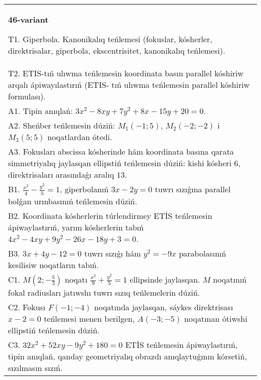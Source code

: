 \documentclass{article}
\begin{document}
\begin{tabular}{m{17cm}}
\textbf{46-variant}
\newline

T1. Giperbola. Kanonikalıq teńlemesi (fokuslar, kósherler, direktrisalar, giperbola, ekscentrisitet, kanonikalıq teńlemesi).\\

T2. ETIS-tıń ulıwma teńlemesin koordinata basın parallel kóshiriw arqalı ápiwayılastırıń (ETIS- tıń ulıwma teńlemesin parallel kóshiriw formulası).\\

A1. Tipin anıqlań: $3 x^{2}-8 xy+7 y^{2}+8 x-15 y+20=0$.\\

A2. Sheńber teńlemesin dúziń: $M_1 (-1;5) $, $M_2 (-2;-2) $ i $M_3 (5;5) $ noqatlardan ótedi.\\

A3. Fokusları abscissa kósherinde hám koordinata basına qarata simmetriyalıq jaylasqan ellipstiń teńlemesin dúziń: kishi kósheri $6$, direktrisaları arasındaǵı aralıq $13$.\\

B1. $\frac{x^{2}}{4} - \frac{y^{2}}{5} = 1$, giperbolanıń $3x - 2y = 0$ tuwrı sızıǵına parallel bolǵan urınbasınıń teńlemesin dúziń.  \\

B2. Koordinata kósherlerin túrlendirmey ETİS teńlemesin ápiwaylastırıń, yarım kósherlerin tabıń $4x^{2} - 4xy + 9y^{2} - 26x - 18y + 3 = 0$.\\

B3. $3x + 4y - 12 = 0$ tuwrı sızıǵı hám $y^{2} = - 9x$ parabolasınıń kesilisiw noqatların tabıń.  \\

C1. $M(2; - \frac{5}{3})$ noqatı $\frac{x^{2}}{9} + \frac{y^{2}}{5} = 1$ ellipsinde jaylasqan. $M$ noqatınıń fokal radiusları jatıwshı tuwrı sızıq teńlemelerin dúziń.  \\

C2. Fokusı $F( - 1; - 4)$ noqatında jaylasqan, sáykes direktrisası $x - 2 = 0$ teńlemesi menen berilgen, $A( - 3; - 5)$ noqatınan ótiwshi ellipstiń teńlemesin dúziń.  \\

C3. $32x^{2} + 52xy - 9y^{2} + 180 = 0$ ETİS teńlemesin ápiwaylastırıń, tipin anıqlań, qanday geometriyalıq obrazdı anıqlaytuǵının kórsetiń, sızılmasın sızıń.  \\

\end{tabular}
\vspace{1cm}
\end{document}
